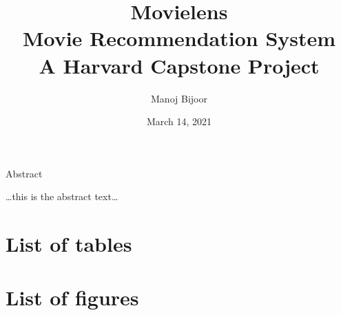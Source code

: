 \documentclass[
]{article}
\title{Movielens\\
Movie Recommendation System\\
A Harvard Capstone Project}
\author{Manoj Bijoor}
\date{March 14, 2021}
\begin{document}
\maketitle


\newpage

\newpage

\begin{center}

\large{Abstract}

\end{center}

\bigskip

\ldots this is the abstract text\ldots{}

\newpage 
\clearpage
{}
\setcounter{secnumdepth}{5}
\setcounter{tocdepth}{5}

\tableofcontents
\clearpage

\newpage
\clearpage
{}

\hypertarget{list-of-tables}{%
\section*{List of tables}\label{list-of-tables}}

\renewcommand{\listtablename}{}

\listoftables
\clearpage

\newpage
\clearpage
{}

\hypertarget{list-of-figures}{%
\section*{List of figures}\label{list-of-figures}}

\renewcommand{\listfigurename}{}

\listoffigures
\clearpage

\newpage
\clearpage
{}
\newcommand{\listequationsname}{List of Equations}
\newcommand{\equations}[1]{%
\refstepcounter{equations}
\par\noindent\textbf{equations \theequations. #1}
\addcontentsline{equ}{equations}{\thesection. \protect\numberline{\theequations}#1}\par}

\makeatletter
\let\l@equations\l@figure
\makeatother
\end{document}
